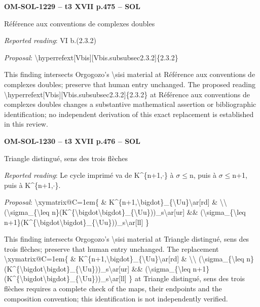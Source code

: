 \par\noindent\textbf{OM-SOL-1229 -- t3 XVII p.475 -- SOL}\par
Référence aux conventions de complexes doubles\par
\emph{Reported reading}: VI b.(2.3.2)\par
\emph{Proposal}: \textbackslash{}hyperrefext[Vbis][Vbis.subsubsec2.3.2]\{2.3.2\}\par
This finding intersects Orgogozo's \textbackslash{}sisi material at Référence aux conventions de complexes doubles; preserve that human entry unchanged. The proposed reading \textbackslash{}hyperrefext[Vbis][Vbis.subsubsec2.3.2]\{2.3.2\} at Référence aux conventions de complexes doubles changes a substantive mathematical assertion or bibliographic identification; no independent derivation of this exact replacement is established in this review.\par
\par\noindent\textbf{OM-SOL-1230 -- t3 XVII p.476 -- SOL}\par
Triangle distingué, sens des trois flèches\par
\emph{Reported reading}: Le cycle imprimé va de K\textasciicircum{}\{n+1,\ensuremath{\cdot}\} à \ensuremath{\sigma}\ensuremath{\leq}n, puis à \ensuremath{\sigma}\ensuremath{\leq}n+1, puis à K\textasciicircum{}\{n+1,\ensuremath{\cdot}\}.\par
\emph{Proposal}: \textbackslash{}xymatrix@C=\allowbreak 1em\{ \& K\textasciicircum{}\{n+1,\textbackslash{}bigdot\}\_\{\textbackslash{}Uu\}\textbackslash{}ar[rd] \& \textbackslash{}\textbackslash{} (\textbackslash{}sigma\_\{\textbackslash{}leq n\}(K\textasciicircum{}\{\textbackslash{}bigdot\textbackslash{}bigdot\}\_\{\textbackslash{}Uu\}))\_s\textbackslash{}ar[ur] \&\& (\textbackslash{}sigma\_\{\textbackslash{}leq n+1\}(K\textasciicircum{}\{\textbackslash{}bigdot\textbackslash{}bigdot\}\_\{\textbackslash{}Uu\}))\_s\textbackslash{}ar[ll] \}\par
This finding intersects Orgogozo's \textbackslash{}sisi material at Triangle distingué, sens des trois flèches; preserve that human entry unchanged. The replacement \textbackslash{}xymatrix@C=\allowbreak 1em\{ \& K\textasciicircum{}\{n+1,\textbackslash{}bigdot\}\_\{\textbackslash{}Uu\}\textbackslash{}ar[rd] \& \textbackslash{}\textbackslash{} (\textbackslash{}sigma\_\{\textbackslash{}leq n\}(K\textasciicircum{}\{\textbackslash{}bigdot\textbackslash{}bigdot\}\_\{\textbackslash{}Uu\}))\_s\textbackslash{}ar[ur] \&\& (\textbackslash{}sigma\_\{\textbackslash{}leq n+1\}(K\textasciicircum{}\{\textbackslash{}bigdot\textbackslash{}bigdot\}\_\{\textbackslash{}Uu\}))\_s\textbackslash{}ar[ll] \} at Triangle distingué, sens des trois flèches requires a complete check of the maps, their endpoints and the composition convention; this identification is not independently verified.\par
